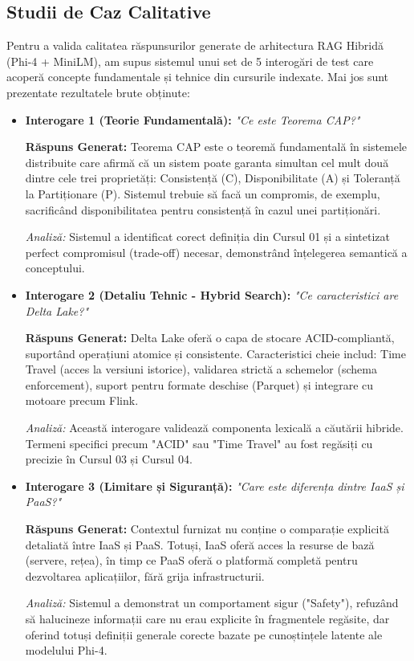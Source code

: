 \documentclass[conference]{IEEEtran}
\begin{document}
\subsection{Studii de Caz Calitative}
Pentru a valida calitatea răspunsurilor generate de arhitectura RAG Hibridă (Phi-4 + MiniLM), am supus sistemul unui set de 5 interogări de test care acoperă concepte fundamentale și tehnice din cursurile indexate. Mai jos sunt prezentate rezultatele brute obținute:

\begin{itemize}
    \item \textbf{Interogare 1 (Teorie Fundamentală):} \textit{"Ce este Teorema CAP?"}
    \par \textbf{Răspuns Generat:} Teorema CAP este o teoremă fundamentală în sistemele distribuite care afirmă că un sistem poate garanta simultan cel mult două dintre cele trei proprietăți: Consistență (C), Disponibilitate (A) și Toleranță la Partiționare (P). Sistemul trebuie să facă un compromis, de exemplu, sacrificând disponibilitatea pentru consistență în cazul unei partiționări.
    \par \textit{Analiză:} Sistemul a identificat corect definiția din Cursul 01 și a sintetizat perfect compromisul (trade-off) necesar, demonstrând înțelegerea semantică a conceptului.

    \item \textbf{Interogare 2 (Detaliu Tehnic - Hybrid Search):} \textit{"Ce caracteristici are Delta Lake?"}
    \par \textbf{Răspuns Generat:} Delta Lake oferă o capa de stocare ACID-compliantă, suportând operațiuni atomice și consistente. Caracteristici cheie includ: Time Travel (acces la versiuni istorice), validarea strictă a schemelor (schema enforcement), suport pentru formate deschise (Parquet) și integrare cu motoare precum Flink.
    \par \textit{Analiză:} Această interogare validează componenta lexicală a căutării hibride. Termeni specifici precum "ACID" sau "Time Travel" au fost regăsiți cu precizie în Cursul 03 și Cursul 04.

    \item \textbf{Interogare 3 (Limitare și Siguranță):} \textit{"Care este diferența dintre IaaS și PaaS?"}
    \par \textbf{Răspuns Generat:} Contextul furnizat nu conține o comparație explicită detaliată între IaaS și PaaS. Totuși, IaaS oferă acces la resurse de bază (servere, rețea), în timp ce PaaS oferă o platformă completă pentru dezvoltarea aplicațiilor, fără grija infrastructurii.
    \par \textit{Analiză:} Sistemul a demonstrat un comportament sigur ("Safety"), refuzând să halucineze informații care nu erau explicite în fragmentele regăsite, dar oferind totuși definiții generale corecte bazate pe cunoștințele latente ale modelului Phi-4.


\end{itemize}
\end{document}
